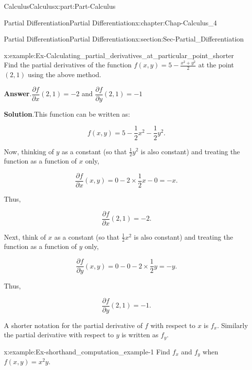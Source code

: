 \documentclass[oneside,10pt,]{book}
\newcommand{\blocktitlefont}{\relax}
\numberwithin{equation}{section}
\begin{document}
\begin{partptx}{Calculus}{}{Calculus}{}{}{x:part:Part-Calculus}
\begin{chapterptx}{Partial Differentiation}{}{Partial Differentiation}{}{}{x:chapter:Chap-Calculus_4}
\begin{sectionptx}{Partial Differentiation}{}{Partial Differentiation}{}{}{x:section:Sec-Partial_Differentiation}
\begin{example}{}{x:example:Ex-Calculating_partial_derivatives_at_particular_point_shorter}%
Find the partial derivatives of the function \(f(x,y) = 5 - \frac{x^2+y^2}{2}\) at the point \((2,1)\) using the above method.%
\par\smallskip%
\noindent\textbf{\blocktitlefont Answer}.\hypertarget{g:answer:id546074}{}\quad{}\(\dfrac{\partial f}{\partial x}(2,1) = -2\) and \(\dfrac{\partial f}{\partial y}(2,1) = -1\)%
\par\smallskip%
\noindent\textbf{\blocktitlefont Solution}.\hypertarget{g:solution:id546076}{}\quad{}This function can be written as:%
\par
%
\begin{equation*}
f(x,y) = 5 - \frac{1}{2}x^2 - \frac{1}{2}y^2.
\end{equation*}
%
\par
Now, thinking of \(y\) as a constant (so that \(\frac{1}{2}y^2\) is also constant) and treating the function as a function of \(x\) only,%
\par
%
\begin{equation*}
\dfrac{\partial f}{\partial x}(x,y) = 0 - 2 \times \frac{1}{2}x - 0 = -x.
\end{equation*}
%
\par
Thus,%
\par
%
\begin{equation*}
\dfrac{\partial f}{\partial x}(2,1) = -2.
\end{equation*}
%
\par
Next, think of \(x\) as a constant (so that \(\frac{1}{2}x^2\) is also constant) and treating the function as a function of \(y\) only,%
\par
%
\begin{equation*}
\dfrac{\partial f}{\partial y}(x,y) = 0-0-2\times \frac{1}{2} y = -y.
\end{equation*}
%
\par
Thus,%
\par
%
\begin{equation*}
\dfrac{\partial f}{\partial y}(2,1) = -1.
\end{equation*}
%
\end{example}
A shorter notation for the partial derivative of \(f\) with respect to \(x\) is \(f_x\). Similarly the partial derivative with respect to \(y\) is written as \(f_y\).%
\begin{example}{}{x:example:Ex-shorthand_computation_example-1}%
Find \(f_x\) and \(f_y\) when \(f(x,y) = x^2y\).%

\end{example}
\end{sectionptx}
\end{chapterptx}
\end{partptx}
\end{document}
